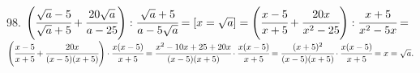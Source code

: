 98. $\left(\cfrac{\sqrt{a}-5}{\sqrt{a}+5}+\cfrac{20\sqrt{a}}{a-25}\right):\cfrac{\sqrt{a}+5}{a-5\sqrt{a}}=[x=\sqrt{a}]=
\left(\cfrac{x-5}{x+5}+\cfrac{20x}{x^2-25}\right):\cfrac{x+5}{x^2-5x}=$\\$
\left(\cfrac{x-5}{x+5}+\cfrac{20x}{(x-5)(x+5)}\right)\cdot\cfrac{x(x-5)}{x+5}=\cfrac{x^2-10x+25+20x}{(x-5)(x+5)}\cdot\cfrac{x(x-5)}{x+5}=
\cfrac{(x+5)^2}{(x-5)(x+5)}\cdot\cfrac{x(x-5)}{x+5}=x=\sqrt{a}.$\\
